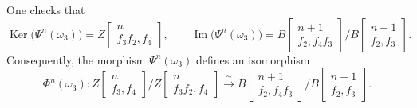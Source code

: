 \clearpage
{}%
\begingroup\small\setlength{\parskip}{0pt}\setlength{\emergencystretch}{2em}
One checks that
\[
\operatorname{Ker}\bigl(\Psi^n(\omega_3)\bigr)
=Z\!\begin{bmatrix}n\\ f_3f_2,f_4\end{bmatrix},
\qquad
\operatorname{Im}\bigl(\Psi^n(\omega_3)\bigr)
=B\!\begin{bmatrix}n+1\\ f_2,f_4f_3\end{bmatrix}
 \Big/
 B\!\begin{bmatrix}n+1\\ f_2,f_3\end{bmatrix}.
\]
Consequently, the morphism $\Psi^n(\omega_3)$ defines an isomorphism
\[
\Phi^n(\omega_3)\colon
Z\!\begin{bmatrix}n\\ f_3,f_4\end{bmatrix}
 \Big/
Z\!\begin{bmatrix}n\\ f_3f_2,f_4\end{bmatrix}
\xrightarrow{\ \sim\ }
B\!\begin{bmatrix}n+1\\ f_2,f_4f_3\end{bmatrix}
 \Big/
B\!\begin{bmatrix}n+1\\ f_2,f_3\end{bmatrix}.
\]

